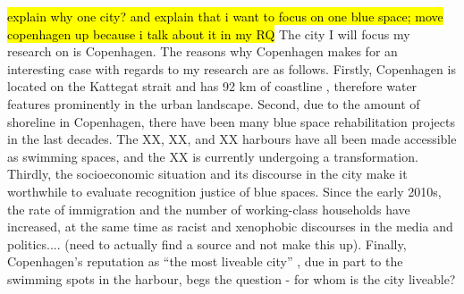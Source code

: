 \documentclass{article}
\begin{document}

\hl{explain why one city? and explain that i want to focus on one blue space; move copenhagen up because i talk about it in my RQ}
The city I will focus my research on is Copenhagen.
The reasons why Copenhagen makes for an interesting case with regards to my research are as follows. 
Firstly, Copenhagen is located on the Kattegat strait and has 92 km of coastline \parencite{comertler2017greens}, therefore water features prominently in the urban landscape.
Second, due to the amount of shoreline in Copenhagen, there have been many blue space rehabilitation projects in the last decades. The XX, XX, and XX harbours have all been made accessible as swimming spaces, and the XX is currently undergoing a transformation.
Thirdly, the socioeconomic situation and its discourse in the city make it worthwhile to evaluate recognition justice of blue spaces. Since the early 2010s, the rate of immigration and the number of working-class households have increased, at the same time as racist and xenophobic discourses in the media and politics.... \parencite{???} (need to actually find a source and not make this up).
Finally, Copenhagen's reputation as ``the most liveable city'' \parencite{visitdenmark_2021}, due in part to the swimming spots in the harbour, begs the question - for whom is the city liveable?

\printbibliography
\end{document}
